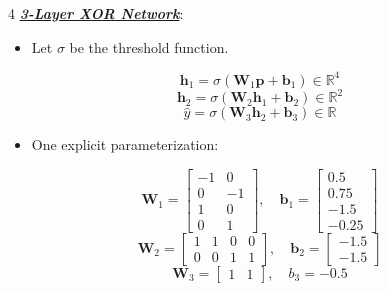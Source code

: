 \documentclass[12pt]{article}
\newcommand{\bulletPoint}[1]{\ul{\textit{\textbf{#1}}}}
\begin{document}
\begin{multicols*}{4}
\bulletPoint{3-Layer XOR Network}:
\begin{itemize}
\item Let $\sigma$ be the threshold function.
\end{itemize}
\useshortskip
\begin{equation*}
    \mathbf{h}_1=\sigma(\mathbf{W}_1\mathbf{p}+\mathbf{b}_1)\in\mathbb{R}^4
\end{equation*}
\useshortskip
\begin{equation*}
    \mathbf{h}_2=\sigma(\mathbf{W}_2\mathbf{h}_1+\mathbf{b}_2)\in\mathbb{R}^2
\end{equation*}
\useshortskip
\begin{equation*}
    \hat{y}=\sigma(\mathbf{W}_3\mathbf{h}_2+\mathbf{b}_3)\in\mathbb{R}
\end{equation*}
\begin{itemize}
\item One explicit parameterization:
\end{itemize}
\useshortskip
\begin{equation*}
    \mathbf{W}_1=
    \begin{bmatrix}
    -1 & 0\\
    0 & -1\\
    1 & 0\\
    0 & 1
    \end{bmatrix},\quad
    \mathbf{b}_1=
    \begin{bmatrix}
    0.5\\
    0.75\\
    -1.5\\
    -0.25
    \end{bmatrix}
\end{equation*}
\useshortskip
\begin{equation*}
    \mathbf{W}_2=
    \begin{bmatrix}
    1 & 1 & 0 & 0\\
    0 & 0 & 1 & 1
    \end{bmatrix},\quad
    \mathbf{b}_2=
    \begin{bmatrix}
    -1.5\\
    -1.5
    \end{bmatrix}
\end{equation*}
\useshortskip
\begin{equation*}
    \mathbf{W}_3=
    \begin{bmatrix}
    1 & 1
    \end{bmatrix},\quad
    b_3=-0.5
\end{equation*}

\end{multicols*}
\end{document}
